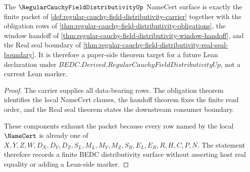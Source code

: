 \begin{theorem}
\label{thm:regular-cauchy-field-distributivity-namecert-surface}
The $\RegularCauchyFieldDistributivityUp$ NameCert surface is exactly the finite packet of \autoref{def:regular-cauchy-field-distributivity-carrier} together with the obligation rows of \autoref{thm:regular-cauchy-field-distributivity-obligations}, the window handoff of \autoref{thm:regular-cauchy-field-distributivity-window-handoff}, and the Real seal boundary of \autoref{thm:regular-cauchy-field-distributivity-real-seal-boundary}. It is therefore a paper-side theorem target for a future Lean declaration under $BEDC.Derived.RegularCauchyFieldDistributivityUp$, not a current Lean marker.
\end{theorem}
\begin{proof}
The carrier supplies all data-bearing rows. The obligation theorem identifies the local NameCert clauses, the handoff theorem fixes the finite read order, and the Real seal theorem states the downstream consumer boundary.

These components exhaust the packet because every row named by the local $\NameCert$ is already one of $X,Y,Z,W,D_X,D_Y,D_Z,S_L,M_L,M_Y,M_Z,S_R,E_L,E_R,R,H,C,P,N$. The statement therefore records a finite BEDC distributivity surface without asserting host real equality or adding a Lean-side marker.
\end{proof}


